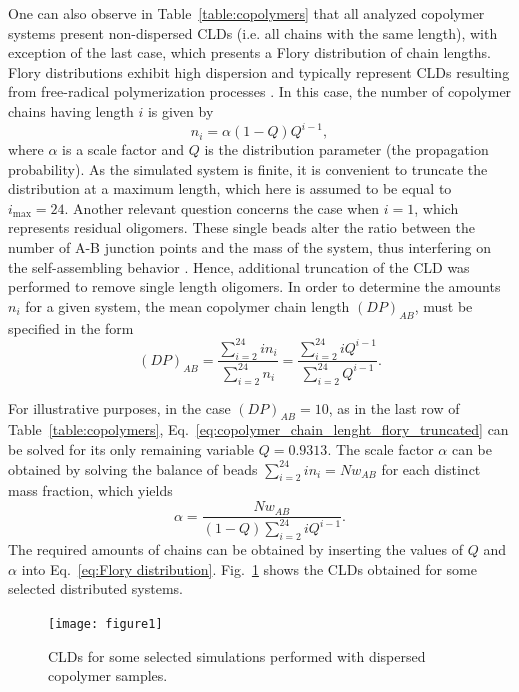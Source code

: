 \documentclass[
aip,
jcp,
reprint,
]{revtex4-1}
\begin{document}
One can also observe in Table~\ref{table:copolymers} that all analyzed copolymer systems present non-dispersed CLDs (i.e. all chains with the same length), with exception of the last case, which presents a Flory distribution of chain lengths.
Flory distributions exhibit high dispersion and typically represent CLDs resulting from free-radical polymerization processes \cite{Peebles_1971}.
In this case, the number of copolymer chains having length $i$ is given by
\begin{equation}
\label{eq:Flory distribution}
n_i = \alpha (1-Q)Q^{i-1},
\end{equation}
where $\alpha$ is a scale factor and $Q$ is the distribution parameter (the propagation probability).
As the simulated system is finite, it is convenient to truncate the distribution at a maximum length, which here is assumed to be equal to $i_\mathrm{max} = 24$.
Another relevant question concerns the case when $i=1$, which represents residual oligomers.
These single beads alter the ratio between the number of A-B junction points and the mass of the system, thus interfering on the self-assembling behavior \cite{Matsen_1996}.
Hence, additional truncation of the CLD was performed to remove single length oligomers.
In order to determine the amounts $n_i$ for a given system, the mean copolymer chain length $(DP)_{AB}$, must be specified in the form
\begin{equation}
\label{eq:copolymer_chain_lenght_flory_truncated}
(DP)_{AB} = \frac{\sum_{i=2}^{24} i n_i}{\sum_{i=2}^{24} n_i} = \frac{\sum_{i=2}^{24} i Q^{i-1}}{\sum_{i=2}^{24} Q^{i-1}}.
\end{equation}

For illustrative purposes, in the case $(DP)_{AB} = 10$, as in the last row of Table~\ref{table:copolymers}, Eq.~\eqref{eq:copolymer_chain_lenght_flory_truncated} can be solved  for its only remaining variable $Q = 0.9313$.
The scale factor $\alpha$ can be obtained by solving the balance of beads $\sum_{i=2}^{24} i n_i = N w_{AB}$ for each distinct mass fraction, which yields
\begin{equation}
\alpha = \frac{N w_{AB}}{(1-Q) \sum_{i=2}^{24} i Q^{i-1}}.
\end{equation}
The required amounts of chains can be obtained by inserting the values of $Q$ and $\alpha$ into Eq.~\eqref{eq:Flory distribution}.
Fig.~\ref{fig:Figure_1} shows the CLDs obtained for some selected distributed systems.

\begin{figure}
	\centering
	\texttt{[image: figure1]}
	\caption{CLDs for some selected simulations performed with dispersed copolymer samples.}
	\label{fig:Figure_1}
\end{figure}
\end{document}

